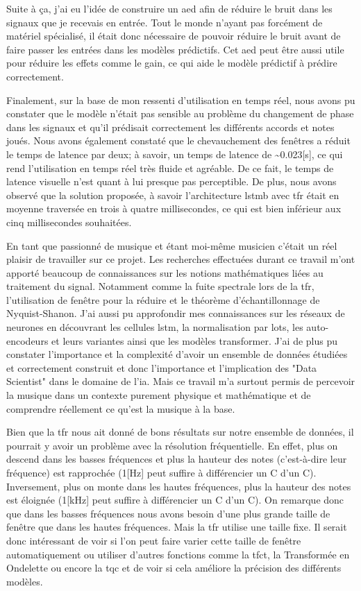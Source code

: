 Suite à ça, j'ai eu l'idée de construire un \gls{aed} afin de réduire le bruit dans les signaux que je recevais en entrée. Tout le monde n'ayant pas forcément de matériel spécialisé, il était donc nécessaire de pouvoir réduire le bruit avant de faire passer les entrées dans les modèles prédictifs. Cet \gls{aed} peut être aussi utile pour réduire les effets comme le gain, ce qui aide le modèle prédictif à prédire correctement.

Finalement, sur la base de mon ressenti d'utilisation en temps réel, nous avons pu constater que le modèle n’était pas sensible au problème du changement de phase dans les signaux et qu’il prédisait correctement les différents accords et notes joués. Nous avons également constaté que le chevauchement des fenêtres a réduit le temps de latence par deux; à savoir, un temps de latence de \textasciitilde0.023[s], ce qui rend l’utilisation en temps réel très fluide et agréable. De ce fait, le temps de latence visuelle n’est quant à lui presque pas perceptible. De plus, nous avons observé que la solution proposée, à savoir l’architecture \gls{lstmb} avec \gls{tfr} était en moyenne traversée en trois à quatre millisecondes, ce qui est bien inférieur aux cinq millisecondes souhaitées.

En tant que passionné de musique et étant moi-même musicien c'était un réel plaisir de travailler sur ce projet. Les recherches effectuées durant ce travail m'ont apporté beaucoup de connaissances sur les notions mathématiques liées au traitement du signal. Notamment comme la fuite spectrale lors de la \gls{tfr}, l'utilisation de fenêtre pour la réduire et le théorème d'échantillonnage de Nyquist-Shanon. J'ai aussi pu approfondir mes connaissances sur les réseaux de neurones en découvrant les cellules \gls{lstm}, la normalisation par lots, les auto-encodeurs et leurs variantes ainsi que les modèles transformer. J'ai de plus pu constater l'importance et la complexité d'avoir un ensemble de données étudiées et correctement construit et donc l'importance et l'implication des "Data Scientist" dans le domaine de l'\gls{ia}. Mais ce travail m'a surtout permis de percevoir la musique dans un contexte purement physique et mathématique et de comprendre réellement ce qu'est la musique à la base.

Bien que la \gls{tfr} nous ait donné de bons résultats sur notre ensemble de données, il pourrait y avoir un problème avec la résolution fréquentielle. En effet, plus on descend dans les basses fréquences et plus la hauteur des notes (c'est-à-dire leur fréquence) est rapprochée (1[Hz] peut suffire à différencier un C d'un C\sh). Inversement, plus on monte dans les hautes fréquences, plus la hauteur des notes est éloignée (1[kHz] peut suffire à différencier un C d'un C\sh). On remarque donc que dans les basses fréquences nous avons besoin d'une plus grande taille de fenêtre que dans les hautes fréquences. Mais la \gls{tfr} utilise une taille fixe. Il serait donc intéressant de voir si l'on peut faire varier cette taille de fenêtre automatiquement ou utiliser d'autres fonctions comme la \gls{tfct}, la Transformée en Ondelette ou encore la \gls{tqc} et de voir si cela améliore la précision des différents modèles.

